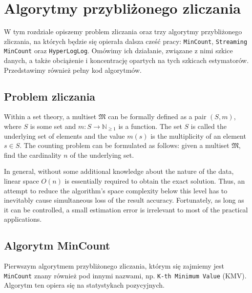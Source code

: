 \chapter{Algorytmy przybliżonego zliczania}
\thispagestyle{chapterBeginStyle}
\label{rozdzial1}

W tym rozdziale  opiszemy problem zliczania oraz trzy  algorytmy przybliżonego zliczania, na których będzie się opierała dalsza cześć pracy:  \texttt{MinCount},  \texttt{Streaming MinCount} oraz \texttt{HyperLogLog}. Omówimy ich działanie, związane z nimi szkice danych, a także obciążenie i koncentrację opartych na tych szkicach estymatorów. Przedstawimy również pełny kod algorytmów. 


\section{Problem zliczania}

Within a set theory, a multiset $\mathfrak{M}$ can be formally defined as a pair $(S, m)$,
where $S$ is some set and $m : S \rightarrow \mathbb{N}_{\geq 1}$ is a function.
The set $S$ is called the underlying set of elements and the value
$m(s)$ is the multiplicity of an element $s \in S$.
The counting problem can be formulated as follows:
given a multiset $\mathfrak{M}$, find the cardinality $n$ of the underlying set.

In general, without some additional knowledge about the nature of the data,
linear space $O(n)$ is essentially required to obtain the exact solution.
Thus, an attempt to reduce the algorithm's space complexity below this level has to inevitably cause
simultaneous loss of the result accuracy.
\mbox{Fortunately}, as long as it can be controlled,
a small estimation error is irrelevant to most of the practical applications.


\section{Algorytm MinCount}

Pierwszym algorytmem przybliżonego zliczania, którym się zajmiemy jest \texttt{MinCount} znany również pod innymi nazwami, np.  \texttt{K-th Minimum Value} (KMV). Algorytm ten opiera się na statystykach pozycyjnych.

